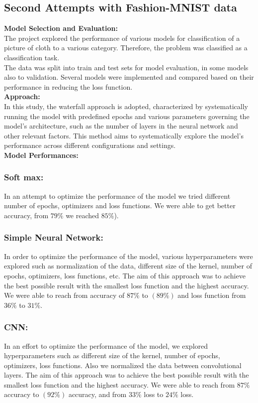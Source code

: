 \documentclass{article}
\begin{document}
\subsection{Second Attempts with Fashion-MNIST data}
\textbf{Model Selection and Evaluation:}\\
The project explored the performance of various models for classification of a picture of cloth to a various category. Therefore, the problem was classified as a classification task.\\
The data was split into train and test sets for model evaluation, in some models also to validation. Several models were implemented and compared based on their performance in reducing the loss function.\\\newline
\textbf{Approach:}\\
In this study, the waterfall approach is adopted, characterized by systematically running the model with predefined epochs and various parameters governing the model's architecture, such as the number of layers in the neural network and other relevant factors. This method aims to systematically explore the model's performance across different configurations and settings.\\\newline
\textbf{Model Performances:}
\subsubsection{Soft max:}
In an attempt to optimize the performance of the model we tried different number of epochs, optimizers and loss functions. We were able to get better accuracy, from ${79\%}$ we reached ${85\%}$).\\

\subsubsection{Simple Neural Network:}
In order to optimize the performance of the model, various hyperparameters were explored such as normalization of the data, different size of the kernel, number of epochs, optimizers, loss functions, etc.
The aim of this approach was to achieve the best possible result with the smallest loss function and the highest accuracy. We were able to reach from accuracy of ${87\%}$ to $(89\%)$ and loss function from ${36\%}$ to ${31\%}$.\\

\subsubsection{CNN:}
In an effort to optimize the performance of the model, we explored hyperparameters such as different size of the kernel, number of epochs, optimizers, loss functions. Also  we normalized the data between convolutional layers.
The aim of this approach was to achieve the best possible result with the smallest loss function and the highest accuracy. We were able to reach from ${87\%}$ accuracy to $(92\%)$ accuracy, and from ${33\%}$ loss to ${24\%}$ loss.\\
\end{document}
